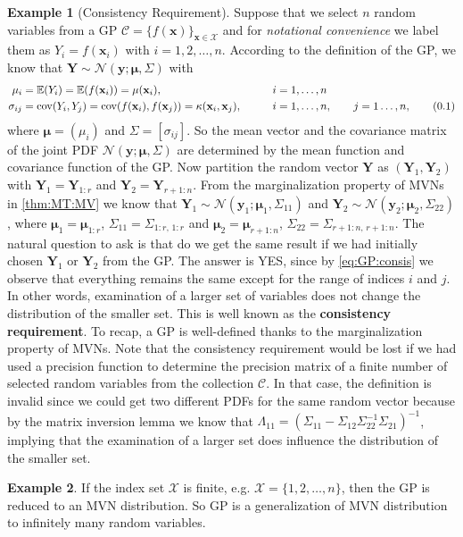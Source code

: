 \documentclass[10pt]{article}
\theoremstyle{definition}
\theoremstyle{definition}
\newtheorem{exmp}{Example}[section]
\theoremstyle{remark}
\newcommand\eqnum{\addtocounter{equation}{1}\tag{\arabic{section}.\arabic{equation}}}
\DeclareMathOperator{\cov}{cov}
\begin{document}
\begin{exmp}[Consistency Requirement]
Suppose that we select $n$ random variables from a GP $\mathscr{C} = \{f(\mathbf{x})\}_{\mathbf{x}\in\mathcal{X}}$ and for \textit{notational convenience} we label them as $Y_i=f(\mathbf{x}_i)$ with $i=1,2,\dots,n$. According to the definition of the GP, we know that $\mathbf{Y}\sim\mathcal{N}(\mathbf{y};\boldsymbol{\mu}, \mathsf{\Sigma})$ with
\begin{alignat*}{2}
\mu_i &= \mathbb{E}(Y_i) =\mathbb{E}(f(\mathbf{x}_i)) = \mu(\mathbf{x}_i), && i=1,\dots, n\\
\sigma_{ij} &= \cov(Y_i, Y_j) = \cov(f(\mathbf{x}_i), f(\mathbf{x}_j)) = \kappa(\mathbf{x}_i, \mathbf{x}_j), \qquad && i=1,\dots, n, \qquad j = 1\dots,n,
\eqnum
\label{eq:GP:consis}
\end{alignat*}
where $\boldsymbol{\mu}=(\mu_i)$ and $\mathsf{\Sigma}=[\sigma_{ij}]$. So the mean vector and the covariance matrix of the joint PDF $\mathcal{N}(\mathbf{y};\boldsymbol{\mu}, \mathsf{\Sigma})$ are determined by the mean function and covariance function of the GP. Now partition the random vector $\mathbf{Y}$ as $(\mathbf{Y}_1, \mathbf{Y}_2)$ with $\mathbf{Y}_1=\mathbf{Y}_{1:r}$ and $\mathbf{Y}_2=\mathbf{Y}_{r+1:n}$. From the marginalization property of MVNs in \cref{thm:MT:MV} we know that $\mathbf{Y}_1 \sim \mathcal{N}(\mathbf{y}_1; \boldsymbol{\mu}_1, \mathsf{\Sigma}_{11})$ and $\mathbf{Y}_2 \sim \mathcal{N}(\mathbf{y}_2; \boldsymbol{\mu}_2, \mathsf{\Sigma}_{22})$, where $\boldsymbol{\mu}_1 = \boldsymbol{\mu}_{1:r}$, $\mathsf{\Sigma}_{11}=\mathsf{\Sigma}_{1:r,\,1:r}$ and $\boldsymbol{\mu}_2 = \boldsymbol{\mu}_{r+1:n}$, $\mathsf{\Sigma}_{22}=\mathsf{\Sigma}_{r+1:n,\,r+1:n}$. The natural question to ask is that do we get the same result if we had initially chosen $\mathbf{Y}_1$ or $\mathbf{Y}_2$ from the GP. The answer is YES, since by \cref{eq:GP:consis} we observe that everything remains the same except for the range of indices $i$ and $j$. In other words, examination of a larger set of variables does not change the distribution of the smaller set. This is well known as the \textbf{consistency requirement}. To recap, a GP is well-defined thanks to the marginalization property of MVNs. Note that the consistency requirement would be lost if we had used a precision function to determine the precision matrix of a finite number of selected random variables from the collection $\mathscr{C}$. In that case, the definition is invalid since we could get two different PDFs for the same random vector because by the matrix inversion lemma we know that $\mathsf{\Lambda}_{11} = (\mathsf{\Sigma}_{11} - \mathsf{\Sigma}_{12} \mathsf{\Sigma}_{22}^{-1} \mathsf{\Sigma}_{21})^{-1}$, implying that the examination of a larger set does influence the distribution of the smaller set.
\end{exmp}
\begin{exmp}
If the index set $\mathcal{X}$ is finite, e.g. $\mathcal{X}=\{1,2,\dots,n\}$, then the GP is reduced to an MVN distribution. So GP is a generalization of MVN distribution to infinitely many random variables.
\end{exmp}
\end{document}

